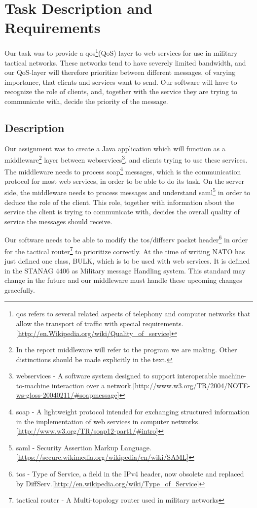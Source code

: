 \section{Task Description and Requirements}\label{Task Description and Requirements} 
    Our task was to provide a \gls{qos}\footnote{\gls{qos} refers to several related aspects of telephony and computer networks that allow the transport of traffic with special requirements.[\url{http://en.Wikipedia.org/wiki/Quality_of_service}]}(QoS) layer to web services for use in military tactical networks. These networks tend to have severely limited bandwidth, and our QoS-layer will therefore prioritize between different messages, of varying importance, that clients and services want to send. Our software will have to recognize the role of clients, and, together with the service they are trying to communicate with, decide the priority of the message.
    
    \subsection{Description}\label{Description}        
    Our assignment was to create a Java application which will function as a \gls{middleware}\footnote{In the report \gls{middleware} will refer to the program we are making. Other distinctions should be made explicitly in the text.} layer between \glspl{webservice}\footnote{\glspl{webservice} - A software system designed to support interoperable machine-to-machine interaction over a network.[\url{http://www.w3.org/TR/2004/NOTE-ws-gloss-20040211/\#soapmessage}]}, and clients trying to use these services. The middleware needs to process \gls{soap}\footnote{\gls{soap} - A lightweight protocol intended for exchanging structured information in the implementation of web services in computer networks.[\url{http://www.w3.org/TR/soap12-part1/\#intro}]} messages, which is the communication protocol for most web services, in order to be able to do its task. On the server side, the middleware needs to process messages and understand \gls{saml}\footnote{\gls{saml} - Security Assertion Markup Language.[\url{https://secure.wikimedia.org/wikipedia/en/wiki/SAML}]} in order to deduce the role of the client. This role, together with information about the service the client is trying to communicate with, decides the overall quality of service the messages should receive. 

    Our software needs to be able to modify the \gls{tos}/\gls{diffserv} \gls{packet} header\footnote{\gls{tos} - Type of Service, a field in the IPv4 header, now obsolete and replaced by DiffServ.[\url{http://en.wikipedia.org/wiki/Type_of_Service}]} in order for the \gls{tactical router}\footnote{\Gls{tactical router} - A Multi-topology router used in military networks} to prioritize correctly. At the time of writing NATO has just defined one class, BULK, which is to be used with web services. It is defined in the STANAG 4406 as Military message Handling system. This standard may change in the future and our middleware must handle these upcoming changes gracefully.

